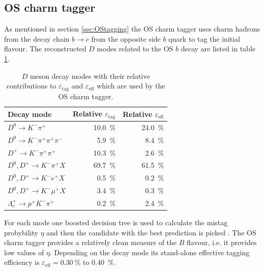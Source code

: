 \documentclass{PoS}
\begin{document}
%

\subsection{OS charm tagger}

As mentioned in section \ref{sec:OStagging} the OS charm tagger uses charm hadrons from the decay chain $b\to c$ from the opposite side $b$ quark to tag the initial flavour. The reconstructed $D$ modes related to the OS $b$ decay are listed in table \ref{tab:OScharm}.
\begin{table}[htbp]
  \centering
  \begin{tabular}{lrr}
  \toprule
  Decay mode &Relative $\varepsilon_\text{tag}$ & Relative $\varepsilon_\text{eff}$ \\
  \midrule
  $D^0\to K^-\pi^+$ & \SI{10.0}{\%} & \SI{24.0}{\%} \\ 
  $D^0\to K^-\pi^+\pi^+\pi^-$ & \SI{5.9}{\%} & \SI{8.4}{\%} \\
  $D^+\to K^-\pi^+\pi^+$ & \SI{10.3}{\%} & \SI{2.6}{\%} \\
  $D^0,D^+\to K^-\pi^+X$ & \SI{69.7}{\%} & \SI{61.5}{\%} \\
  $D^0,D^+\to K^-e^+X$ & \SI{0.5}{\%} & \SI{0.2}{\%} \\
  $D^0,D^+\to K^-\mu^+X$ & \SI{3.4}{\%} & \SI{0.3}{\%} \\
  $\Lambda_c^+\to p^+K^-\pi^+$ & \SI{0.2}{\%} & \SI{2.4}{\%} \\
  \bottomrule
  \end{tabular}
  \small{\caption{$D$ meson decay modes with their relative contributions to $\varepsilon_\text{tag}$ and $\varepsilon_\text{eff}$ which are used by the OS charm tagger.}}
  \label{tab:OScharm}
\end{table}
For each mode one boosted decision tree is used to calculate the mistag probybility $\eta$ and then the candidate with the best prediction is picked \cite{12}. The OS charm tagger provides a relatively clean measure of the $B$ flavour, i.e. it provides low values of $\eta$. Depending on the decay mode its stand-alone effective tagging efficiency is $\varepsilon_\text{eff}=\SI{0.30}{\%}$ to \SI{0.40}{\%}.
\end{document}
